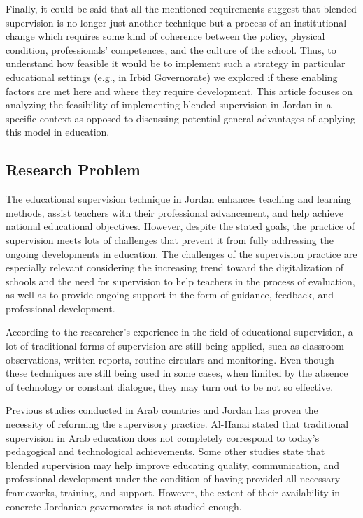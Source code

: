 \documentclass[10pt]{NSP1}
\begin{document}
Finally, it could be said that all the mentioned requirements suggest that blended supervision is no longer just another technique but a process of an institutional change which requires some kind of coherence between the policy, physical condition, professionals' competences, and the culture of the school. Thus, to understand how feasible it would be to implement such a strategy in particular educational settings (e.g., in Irbid Governorate) we explored if these enabling factors are met here and where they require development. This article focuses on analyzing the feasibility of implementing blended supervision in Jordan in a specific context as opposed to discussing potential general advantages of applying this model in education.

\subsection{Research Problem}

The educational supervision technique in Jordan enhances teaching and learning methods, assist teachers with their professional advancement, and help achieve national educational objectives. However, despite the stated goals, the practice of supervision meets lots of challenges that prevent it from fully addressing the ongoing developments in education. The challenges of the supervision practice are especially relevant considering the increasing trend toward the digitalization of schools and the need for supervision to help teachers in the process of evaluation, as well as to provide ongoing support in the form of guidance, feedback, and professional development.

According to the researcher's experience in the field of educational supervision, a lot of traditional forms of supervision are still being applied, such as classroom observations, written reports, routine circulars and monitoring. Even though these techniques are still being used in some cases, when limited by the absence of technology or constant dialogue, they may turn out to be not so effective.

Previous studies conducted in Arab countries and Jordan has proven the necessity of reforming the supervisory practice. Al-Hanai \cite{ref20} stated that traditional supervision in Arab education does not completely correspond to today's pedagogical and technological achievements. Some other studies state that blended supervision may help improve educating quality, communication, and professional development under the condition of having provided all necessary frameworks, training, and support\cite{ref21,ref22,ref23}. However, the extent of their availability in concrete Jordanian governorates is not studied enough.
\end{document}

